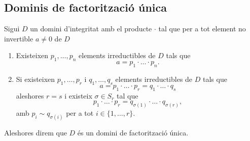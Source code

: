 \documentclass[../Apunts.tex]{subfiles}
\begin{document}
	\subsection{Dominis de factorització única}
	\begin{definition}
		\label{def:domini de factorització única}
		\label{def:DFU}
		Sigui \(D\) un domini d'integritat amb el producte \(\cdot\) tal que per a tot element no invertible \(a\neq0\) de \(D\)
		\begin{enumerate}
			\item Existeixen \(p_{1},\dots,p_{n}\) elements irreductibles de \(D\) tals que
			\[a=p_{1}\cdot\ldots\cdot p_{n}.\]
			\item Si existeixen \(p_{1},\dots,p_{r}\) i \(q_{1},\dots,q_{s}\) elements irreductibles de \(D\) tals que
			\[a=p_{1}\cdot\ldots\cdot p_{r}=q_{1}\cdot\ldots\cdot q_{s}\]
			aleshores \(r=s\) i existeix \(\sigma\in S_{r}\) tal que
			\[p_{1}\cdot\ldots\cdot p_{r}=q_{\sigma(1)}\cdot\ldots\cdot q_{\sigma(r)},\]
			amb \(p_{i}\sim q_{\sigma(i)}\) per a tot \(i\in\{1,\dots,r\}\).
		\end{enumerate}
		Aleshores direm que \(D\) és un domini de factorització única.
	\end{definition}
\end{document}
